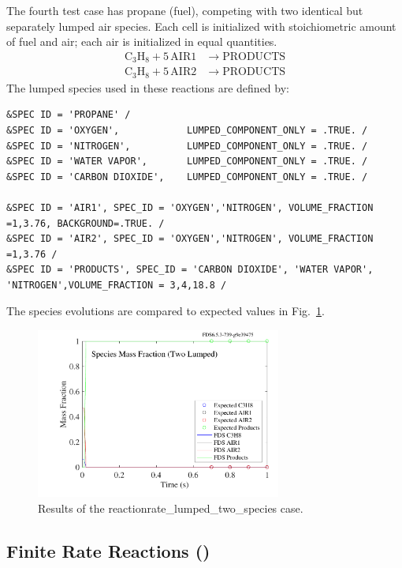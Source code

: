 \documentclass[11pt]{book}
\begin{document}
The fourth test case has propane (fuel), competing with two identical but separately lumped air species. Each cell is initialized with stoichiometric amount of fuel and air; each air is initialized in equal quantities.
\begin{align}\label{eq:lumped_2_air}
\mathrm{C_3H_8 + 5 \, AIR1} &\rightarrow  \mathrm{PRODUCTS} \\
\nonumber \mathrm{C_3H_8 + 5 \, AIR2} &\rightarrow \mathrm{PRODUCTS}
\end{align}
The lumped species used in these reactions are defined by:
\begin{lstlisting}
&SPEC ID = 'PROPANE' /
&SPEC ID = 'OXYGEN',            LUMPED_COMPONENT_ONLY = .TRUE. /
&SPEC ID = 'NITROGEN',          LUMPED_COMPONENT_ONLY = .TRUE. /
&SPEC ID = 'WATER VAPOR',       LUMPED_COMPONENT_ONLY = .TRUE. /
&SPEC ID = 'CARBON DIOXIDE',    LUMPED_COMPONENT_ONLY = .TRUE. /

&SPEC ID = 'AIR1', SPEC_ID = 'OXYGEN','NITROGEN', VOLUME_FRACTION =1,3.76, BACKGROUND=.TRUE. /
&SPEC ID = 'AIR2', SPEC_ID = 'OXYGEN','NITROGEN', VOLUME_FRACTION =1,3.76 /
&SPEC ID = 'PRODUCTS', SPEC_ID = 'CARBON DIOXIDE', 'WATER VAPOR', 'NITROGEN',VOLUME_FRACTION = 3,4,18.8 /
\end{lstlisting}
The species evolutions are compared to expected values in Fig.~\ref{fig:reactionrate_lumped_two_air}.
\begin{figure}[!ht]
\centering
\includegraphics[height=2.2in]{SCRIPT_FIGURES/reactionrate_lumped_two_air}
\caption[Results of the {\ct reactionrate\_lumped\_two\_species} case]{Results of the {\ct reactionrate\_lumped\_two\_species} case.}
\label{fig:reactionrate_lumped_two_air}
\end{figure}



\FloatBarrier

\subsection{Finite Rate Reactions (\texorpdfstring{}{reactionrate\_arrhenius})}
\label{finite_rate_reactions}
\label{reactionrate_arrhenius_equilibrium}
\label{reactionrate_arrhenius_0order_1step}
\label{reactionrate_arrhenius_2order_1step}
\label{reactionrate_arrhenius_1p75order_2step}
\label{reactionrate_arrhenius_1p75order_2stepr}
\end{document}

